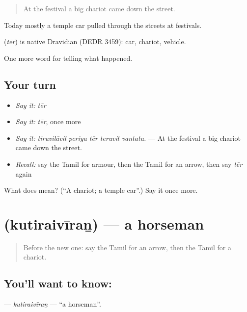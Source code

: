 \begin{quote}
At the festival a big chariot came down the street.
\end{quote}

Today mostly a temple car pulled through the streets at festivals.

\begin{cousinweb}
\textbf{} (\emph{tēr}) is native Dravidian (DEDR 3459): car, chariot, vehicle.
\end{cousinweb}

\begin{grammarlens}[title={What you've built}]
One more word for telling what happened.
\end{grammarlens}

\subsection*{Your turn}
\begin{itemize}
\raggedright
  \item \emph{Say it:} \emph{tēr}
  \item \emph{Say it:} \emph{tēr}, once more
  \item \emph{Say it:} \emph{tiruviḻāvil periya tēr teruvil vantatu.} — At the festival a big chariot came down the street.
  \item \emph{Recall:} say the Tamil for armour, then the Tamil for an arrow, then say \emph{tēr} again
\end{itemize}

\begin{tcolorbox}[breakable,colback=teal!4,colframe=teal!35!black,title={Before you move on}]
What does  mean? (\textquotedblleft{}A chariot; a temple car\textquotedblright{}.) Say it once more.
\end{tcolorbox}
\section[\texorpdfstring{\ta{குதிரைவீரன்} (kutiraivīraṉ)}{குதிரைவீரன் (kutiraivīraṉ)}]{ (kutiraivīraṉ) — a horseman}

\label{lesson:TA-C334-kutiraiviran}



\begin{quote}
Before the new one: say the Tamil for an arrow, then the Tamil for a chariot.
\end{quote}

\subsection*{You'll want to know: }
\textbf{} — \emph{kutiraivīraṉ} — \textquotedblleft{}a horseman\textquotedblright{}.

